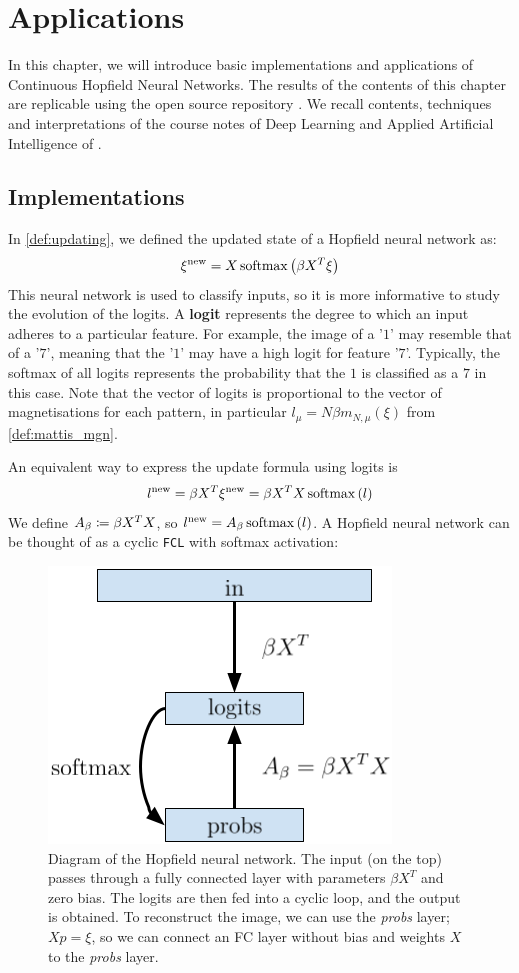 \chapter{Applications}
\label{ch:Applications}
In this chapter, we will introduce basic implementations and applications of Continuous Hopfield Neural Networks. The results of the contents of this chapter are replicable using the open source repository \cite{github_repo}. We recall contents, techniques and interpretations of the course notes of Deep Learning and Applied Artificial Intelligence of \citet{DLAI}.

\section{Implementations}
In \cref{def:updating}, we defined the updated state of a Hopfield neural network as:
\[
\xi^{\text{new}} = X \operatorname{softmax} \left(\beta X^T \xi\right)
\]
This neural network is used to classify inputs, so it is more informative to study the evolution of the logits. A \textbf{logit} represents the degree to which an input adheres to a particular feature. For example, the image of a '$1$' may resemble that of a '$7$', meaning that the '$1$' may have a high logit for feature '$7$'. Typically, the softmax of all logits represents the probability that the $1$ is classified as a $7$ in this case. Note that the vector of logits is proportional to the vector of magnetisations for each pattern, in particular $l_\mu = N\beta m_{N,\mu}(\xi)$ from \cref{def:mattis_mgn}.

\noindent An equivalent way to express the update formula using logits is
\[
l^{\text{new}} = \beta X^T \xi^{\text{new}} = \beta X^T X \operatorname{softmax} \left(l\right)
\]
We define $A_\beta \coloneqq \beta X^T X$, so $l^{\text{new}} = A_\beta \operatorname{softmax} \left(l\right)$. A Hopfield neural network can be thought of as a cyclic \texttt{FCL} with softmax activation:

\begin{figure}[htbp]
	\centering
	\includegraphics[width=0.4\linewidth]{Figures/FCL.png}
	\caption{Diagram of the Hopfield neural network. The input (on the top) passes through a fully connected layer with parameters $\beta X^T$ and zero bias. The logits are then fed into a cyclic loop, and the output is obtained. To reconstruct the image, we can use the \textit{probs} layer; $Xp=\xi$, so we can connect an FC layer without bias and weights $X$ to the \textit{probs} layer.}
	\label{fig:FCL}
\end{figure}

